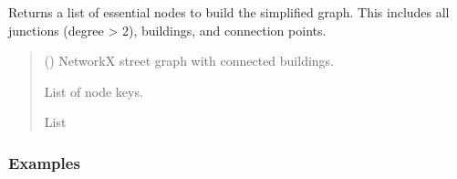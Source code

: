 \documentclass[letterpaper,10pt,english]{sphinxmanual}
\begin{document}
\begin{fulllineitems}
\label{\detokenize{pysewer:pysewer.simplify.get_essential_nodes}}
\pysigstartsignatures
{}
\pysigstopsignatures
\sphinxAtStartPar
Returns a list of essential nodes to build the simplified graph. This includes all junctions (degree \textgreater{} 2), buildings, and connection points.
\begin{quote}\begin{description}
\sphinxAtStartPar
{} () \textendash{} NetworkX street graph with connected buildings.

\sphinxAtStartPar
List of node keys.

\sphinxAtStartPar
List

\end{description}\end{quote}
\subsubsection*{Examples}


\end{fulllineitems}
\end{document}
